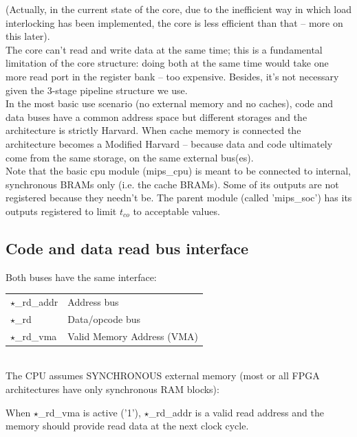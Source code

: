     (Actually, in the current state of the core, due to the inefficient way in
    which load interlocking has been implemented, the core is less efficient
    than that -- more on this later).\\

    The core can't read and write data at the same time; this is a fundamental 
    limitation of the core structure: doing both at the same time would take 
    one more read port in the register bank -- too expensive. Besides, it's not
    necessary given the 3-stage pipeline structure we use.\\

    In the most basic use scenario (no external memory and no caches), code and
    data buses have a common address space but different storages and the
    architecture is strictly Harvard. When cache memory is connected
    the architecture becomes a Modified Harvard -- because data and 
    code ultimately come from the same storage, on the same external 
    bus(es).\\

    Note that the basic cpu module (mips\_cpu) is meant to be connected to 
    internal, synchronous BRAMs only (i.e. the cache BRAMs). Some of its 
    outputs are not registered because they needn't be. The parent module 
    (called 'mips\_soc') has its outputs registered to limit $t_{co}$ to 
    acceptable values.\\


\subsection{Code and data read bus interface}
\label{code_data_buses}
    Both buses have the same interface:\\
    
\begin{tabular}{ l l }
    $\star$\_rd\_addr  & Address bus\\ 
    $\star$\_rd        & Data/opcode bus\\ 
    $\star$\_rd\_vma   & Valid Memory Address (VMA)\\ 
\end{tabular}\\

    The CPU assumes SYNCHRONOUS external memory (most or all FPGA architectures
    have only synchronous RAM blocks):

    When $\star$\_rd\_vma is active ('1'), $\star$\_rd\_addr is a valid read address and the
    memory should provide read data at the next clock cycle.


